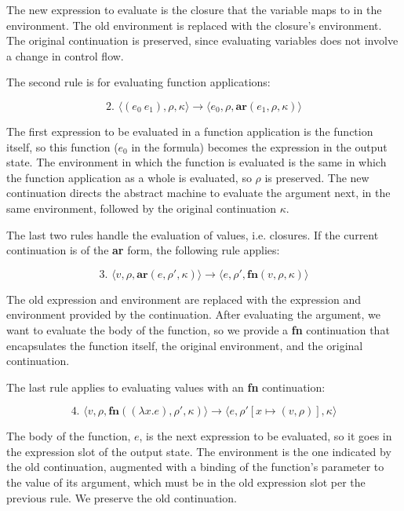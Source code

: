 \documentclass{article}
\begin{document}
The new expression to evaluate is the closure that the variable maps to in the environment. The old environment is replaced with the closure's environment. The original continuation is preserved, since evaluating variables does not involve a change in control flow.

The second rule is for evaluating function applications:

$$
\text{2. }
\langle (e_0\ e_1), \rho, \kappa \rangle
\to
\langle e_0, \rho, \textbf{ar}(e_1, \rho, \kappa) \rangle
$$

The first expression to be evaluated in a function application is the function itself, so this function ($e_0$ in the formula) becomes the expression in the output state. The environment in which the function is evaluated is the same in which the function application as a whole is evaluated, so $\rho$ is preserved. The new continuation directs the abstract machine to evaluate the argument next, in the same environment, followed by the original continuation $\kappa$.

The last two rules handle the evaluation of values, i.e. closures. If the current continuation is of the \textbf{ar} form, the following rule applies:

$$
\text{3. }
\langle v, \rho, \textbf{ar}(e, \rho', \kappa) \rangle
\to
\langle e, \rho', \textbf{fn}(v, \rho, \kappa) \rangle
$$

The old expression and environment are replaced with the expression and environment provided by the continuation. After evaluating the argument, we want to evaluate the body of the function, so we provide a \textbf{fn} continuation that encapsulates the function itself, the original environment, and the original continuation.

The last rule applies to evaluating values with an \textbf{fn} continuation:

$$
\text{4. }
\langle v, \rho, \textbf{fn}((\lambda x.e), \rho', \kappa) \rangle
\to
\langle e, \rho'[x \mapsto (v, \rho)], \kappa \rangle
$$

The body of the function, $e$, is the next expression to be evaluated, so it goes in the expression slot of the output state. The environment is the one indicated by the old continuation, augmented with a binding of the function's parameter to the value of its argument, which must be in the old expression slot per the previous rule. We preserve the old continuation.
\end{document}
